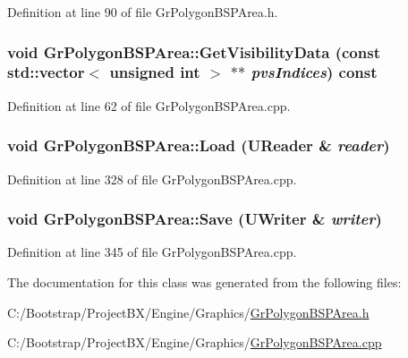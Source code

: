 Definition at line 90 of file GrPolygonBSPArea.h.\hypertarget{class_gr_polygon_b_s_p_area_15324cca2e63613b45d88de81b4f8666}{
\subsubsection[{GetVisibilityData}]{\setlength{\rightskip}{0pt plus 5cm}void GrPolygonBSPArea::GetVisibilityData (const std::vector$<$ unsigned int $>$ $\ast$$\ast$ {\em pvsIndices}) const}}
\label{class_gr_polygon_b_s_p_area_15324cca2e63613b45d88de81b4f8666}




Definition at line 62 of file GrPolygonBSPArea.cpp.\hypertarget{class_gr_polygon_b_s_p_area_034f884ac7b83c468d3b1d2947950013}{
\subsubsection[{Load}]{\setlength{\rightskip}{0pt plus 5cm}void GrPolygonBSPArea::Load ({\bf UReader} \& {\em reader})}}
\label{class_gr_polygon_b_s_p_area_034f884ac7b83c468d3b1d2947950013}




Definition at line 328 of file GrPolygonBSPArea.cpp.\hypertarget{class_gr_polygon_b_s_p_area_22eb539982e6f805ef94c58294940aeb}{
\subsubsection[{Save}]{\setlength{\rightskip}{0pt plus 5cm}void GrPolygonBSPArea::Save ({\bf UWriter} \& {\em writer})}}
\label{class_gr_polygon_b_s_p_area_22eb539982e6f805ef94c58294940aeb}




Definition at line 345 of file GrPolygonBSPArea.cpp.

The documentation for this class was generated from the following files:\begin{CompactItemize}
\item 
C:/Bootstrap/ProjectBX/Engine/Graphics/\hyperlink{_gr_polygon_b_s_p_area_8h}{GrPolygonBSPArea.h}\item 
C:/Bootstrap/ProjectBX/Engine/Graphics/\hyperlink{_gr_polygon_b_s_p_area_8cpp}{GrPolygonBSPArea.cpp}\end{CompactItemize}
